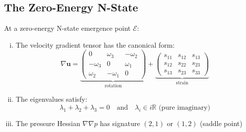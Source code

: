 \subsection{The Zero-Energy N-State}

\begin{theorem}\label{thm:emergence-structure}
At a zero-energy N-state emergence point $\mathcal{E}$:
\begin{enumerate}[(i)]
\item The velocity gradient tensor has the canonical form:
\begin{equation}
\nabla \mathbf{u} = \underbrace{\begin{pmatrix}
0 & \omega_3 & -\omega_2 \\
-\omega_3 & 0 & \omega_1 \\
\omega_2 & -\omega_1 & 0
\end{pmatrix}}_{\text{rotation}} + \underbrace{\begin{pmatrix}
s_{11} & s_{12} & s_{13} \\
s_{12} & s_{22} & s_{23} \\
s_{13} & s_{23} & s_{33}
\end{pmatrix}}_{\text{strain}}
\end{equation}

\item The eigenvalues satisfy:
\begin{equation}
\lambda_1 + \lambda_2 + \lambda_3 = 0 \quad \text{and} \quad \lambda_i \in i\mathbb{R} \text{ (pure imaginary)}
\end{equation}

\item The pressure Hessian $\nabla \nabla p$ has signature $(2,1)$ or $(1,2)$ (saddle point)
\end{enumerate}
\end{theorem}

